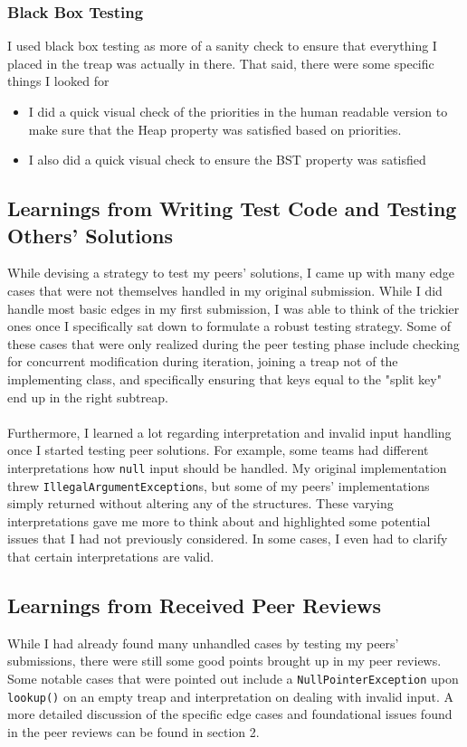 \documentclass[11pt]{article}
\def\tt{\texttt}
\begin{document}
\subsubsection*{Black Box Testing}
I used black box testing as more of a sanity check to ensure that everything I placed in the treap was actually in there. That  said, there were some specific things I looked for
\begin{itemize}
\item I did a quick visual check of the priorities in the human readable version to make sure that the Heap property was satisfied based on priorities. 
\item I also did a quick visual check to ensure the BST property was satisfied
\end{itemize}


\subsection{Learnings from Writing Test Code and Testing Others' Solutions}
While devising a strategy to test my peers' solutions, I  came up with many edge cases that were not themselves handled in my original submission. While I  did handle most basic edges in my first submission, I  was able to think of the trickier ones once I  specifically sat down to formulate a robust testing strategy. Some of these cases that were only realized during the peer testing phase include checking for concurrent modification during iteration,  joining a treap not of the implementing class, and specifically ensuring that keys equal to the "split key" end up in the right subtreap. \\ \\
Furthermore, I  learned a lot regarding interpretation and invalid input handling once I  started testing peer solutions. For example, some teams had different interpretations how \tt{null} input should be handled. My original implementation threw \tt{IllegalArgumentException}s, but some of my peers' implementations simply returned without altering any of the structures. These varying interpretations gave me more to think about and highlighted some potential issues that I  had not previously considered. In some cases, I  even had to clarify that certain interpretations are valid.

\subsection{Learnings from Received Peer Reviews}
While I  had already found many unhandled cases by testing my peers' submissions, there were still some good points brought up in my peer reviews. Some notable cases that were pointed out include a \tt{NullPointerException} upon \tt{lookup()} on an empty treap and interpretation on dealing with invalid input. A more detailed discussion of the specific edge cases and foundational issues found in the peer reviews can be found in section 2.
\end{document}
